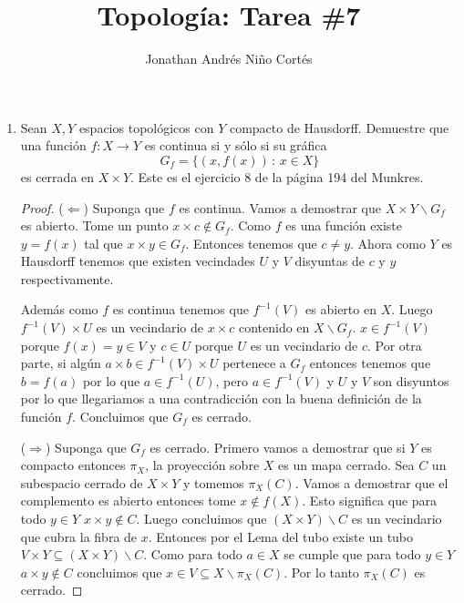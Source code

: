 \documentclass[letter,twoside,12pt]{article}
\title{Topología: Tarea \#7}
\author{Jonathan Andrés Niño Cortés}
\begin{document}
\maketitle
\begin{enumerate}
	\item Sean $ X, Y $ espacios topológicos con $ Y $ compacto de Hausdorff. Demuestre que una función $ f: X \to Y $ es continua si y sólo si su gráfica 
	\begin{equation}
	G_f = \{(x,f(x))\,:\,x \in X \}
	\end{equation}
	es cerrada en $ X \times Y $. Este es el ejercicio 8 de la página 194 del Munkres.
	\begin{proof}
		($ \Leftarrow $) Suponga que $ f $ es continua. Vamos a demostrar que $X \times Y \backslash G_f $ es abierto. Tome un punto $ x \times c \not \in G_f $. Como $ f $ es una función existe $ y = f(x) $ tal que $ x \times y \in G_f $. Entonces tenemos que $ c \not = y $. Ahora como $ Y $ es Hausdorff tenemos que existen vecindades $ U $ y $ V $ disyuntas de $ c $ y $ y $ respectivamente.
		
		Además como $ f $ es continua tenemos que $ f^{-1}(V) $ es abierto en $ X $. Luego $  f^{-1}(V) \times U $ es un vecindario de $ x \times c $ contenido en $ X \backslash G_f $. $ x \in f^{-1}(V) $ porque $ f(x)=y \in V $ y $ c \in U $ porque $ U $ es un vecindario de $ c $. Por otra parte, si algún $ a \times b \in f^{-1}(V) \times U $ pertenece a $ G_f $ entonces tenemos que $ b = f(a) $ por lo que $ a \in f^{-1}(U) $, pero $ a \in f^{-1}(V) $ y $ U $ y $ V $ son disyuntos por lo que llegariamos a una contradicción con la buena definición de la función $ f $. Concluimos que $ G_f $ es cerrado.
		
		($ \Rightarrow $) Suponga que $ G_f $ es cerrado. Primero vamos a demostrar que si $ Y $ es compacto entonces $ \pi_X $, la proyección sobre $ X $ es un mapa cerrado. Sea $ C $ un subespacio cerrado de $ X \times Y $ y tomemos $ \pi_X(C) $. Vamos a demostrar que el complemento es abierto entonces tome $ x \not  \in f(X) $. Esto significa que para todo $ y \in Y $ $ x \times y \not \in C $. Luego concluimos que $ (X \times Y) \backslash C $ es un vecindario que cubra la fibra de $ x $. Entonces por el Lema del tubo existe un tubo $ V \times Y \subseteq (X \times Y)\backslash C $. Como para todo $ a \in X $ se cumple que para todo $ y \in Y $ $ a \times y \not \in C $ concluimos que $ x \in V \subseteq X \backslash \pi_X(C)$. Por lo tanto $  \pi_X(C) $ es cerrado.
		

\end{proof}
\end{enumerate}
\end{document}

